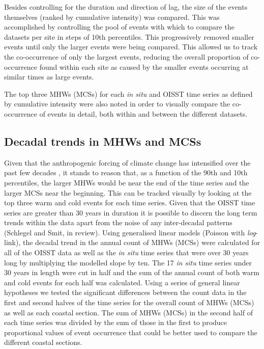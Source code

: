 \documentclass[a4paper,10pt,review]{elsarticle}
\begin{document}
Besides controlling for the duration and direction of lag, the size of the events themselves (ranked by cumulative intensity) was compared. This was accomplished by controlling the pool of events with which to compare the datasets per site in steps of 10th percentiles. This progressively removed smaller events until only the larger events were being compared. This allowed us to track the co-occurrence of only the largest events, reducing the overall proportion of co-occurrence found within each site as caused by the smaller events occurring at similar times as large events.

The top three MHWs (MCSs) for each \emph{in situ} and OISST time series as defined by cumulative intensity were also noted in order to visually compare the co-occurrence of events in detail, both within and between the different datasets.

\subsection{Decadal trends in MHWs and MCSs}
Given that the anthropogenic forcing of climate change has intensified over the past few decades \citep{IPCC2014}, it stands to reason that, as a function of the 90th and 10th percentiles, the larger MHWs would be near the end of the time series and the larger MCSs near the beginning. This can be tracked visually by looking at the top three warm and cold events for each time series. Given that the OISST time series are greater than 30 years in duration it is possible to discern the long term trends within the data apart from the noise of any inter-decadal patterns (Schlegel and Smit, in review). Using generalised linear models (Poisson with \emph{log}-link), the decadal trend in the annual count of MHWs (MCSs) were calculated for all of the OISST data as well as the \emph{in situ} time series that were over 30 years long by multiplying the modelled slope by ten. The 17 \emph{in situ} time series under 30 years in length were cut in half and the sum of the annual count of both warm and cold events for each half was calculated. Using a series of general linear hypotheses \citep{Hothorn2008} we tested the significant differences between the count data in the first and second halves of the time series for the overall count of MHWs (MCSs) as well as each coastal section. The sum of MHWs (MCSs) in the second half of each time series was divided by the sum of those in the first to produce proportional values of event occurrence that could be better used to compare the different coastal sections.
\end{document}
